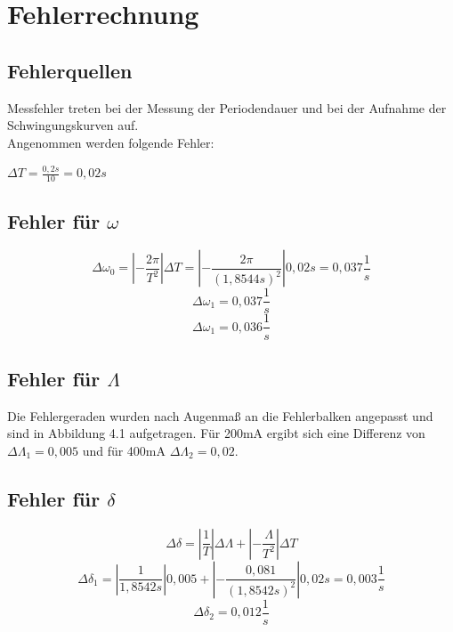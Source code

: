 \documentclass[12pt,a4paper,]{scrreprt}
\begin{document}
\chapter{Fehlerrechnung}
	\section{Fehlerquellen}
    	Messfehler treten bei der Messung der Periodendauer und bei der Aufnahme der Schwingungskurven auf.\\
        Angenommen werden folgende Fehler:\\
        \begin{center}
        $\Delta T = \frac{0,2 s}{10} = 0,02s$\\
		\end{center}
		
    \section{Fehler für $\omega$}
    	\begin{equation}
    		\Delta\omega_0 = |-\frac{2\pi}{T^2}| \Delta T = |-\frac{2\pi}{(1,8544s)^2}| 0,02s = 0,037 \frac{1}{s}
    	\end{equation}
        \begin{equation}
    		\Delta\omega_1 = 0,037 \frac{1}{s}
    	\end{equation}
        \begin{equation}
    		\Delta\omega_1 = 0,036 \frac{1}{s}
    	\end{equation}
        
     
       
	\section{Fehler für $\Lambda$}
    Die Fehlergeraden wurden nach Augenmaß an die Fehlerbalken angepasst und sind in Abbildung 4.1 aufgetragen.
    	Für 200mA ergibt sich eine Differenz von $\Delta\Lambda_1 = 0,005$ und für 400mA $\Delta\Lambda_2 = 0,02$.
        
	\section{Fehler für $\delta$}
    \begin{equation}
    	\Delta\delta = |\frac{1}{T}|\Delta\Lambda + |-\frac{\Lambda}{T^2}|\Delta T
    \end{equation}
    \begin{equation}
    	\Delta\delta_1 = |\frac{1}{1,8542s}|0,005 + |-\frac{0,081}{(1,8542s)^2}|0,02s = 0,003 \frac{1}{s}
    \end{equation}
    \begin{equation}
    	\Delta\delta_2 = 0,012 \frac{1}{s}
    \end{equation}
\pagebreak
    
\end{document}
